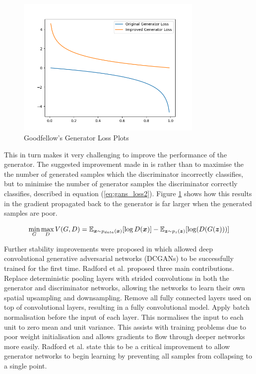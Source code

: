 \documentclass[12pt]{article}
\begin{document}
\begin{figure}[h]
    \centering
        \includegraphics[width=0.8\textwidth]{../figures/goodfellow_gen_losses.png}
    \caption{Goodfellow's Generator Loss Plots \cite{Goodfellow2014}}\label{fig:Goodfellow_plot}
\end{figure}

\noindent This in turn makes it very challenging to improve the performance of the generator.
The suggested improvement made in \cite{Goodfellow2014} is rather than to maximise the the number of generated samples which the discriminator incorrectly classifies, but to minimise the number of generator samples the discriminator correctly classifies, described in equation (\ref{eq:gans_loss2}).
Figure \ref{fig:Goodfellow_plot} shows how this results in the gradient propagated back to the generator is far larger when the generated samples are poor.

\begin{equation} \label{eq:gans_loss2}
    \min_{G} \max_{D} V(G, D) = \mathbb{E}_{{\boldsymbol{{x}}} \sim p_{data}({\boldsymbol{{x}}})} [\log D({\boldsymbol{{x}}})]
                              - \mathbb{E}_{{\boldsymbol{{z}}} \sim p_{z}({\boldsymbol{{z}}})} [\log (D(G({\boldsymbol{{z}}})))]
\end{equation}

Further stability improvements were proposed in \cite{Radford2016} which allowed deep convolutional generative adversarial networks (DCGANs) to be successfully trained for the first time.
Radford et al. proposed three main contributions.
Replace deterministic pooling layers with strided convolutions in both the generator and discriminator networks, allowing the networks to learn their own spatial upsampling and downsampling.
Remove all fully connected layers used on top of convolutional layers, resulting in a fully convolutional model.
Apply batch normalisation \cite{Ioffe2015} before the input of each layer.
This normalises the input to each unit to zero mean and unit variance.
This assists with training problems due to poor weight initialisation and allows gradients to flow through deeper networks more easily.
Radford et al. state this to be a critical improvement to allow generator networks to begin learning by preventing all samples from collapsing to a single point. 
\end{document}
